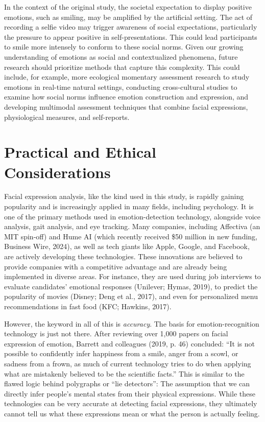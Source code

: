 \documentclass[authordate, reflection,issue]{jote-new-article}
\begin{document}
	In the context of the original study, the societal expectation to display positive emotions, such as smiling, may be amplified by the artificial setting. The act of recording a selfie video may trigger awareness of social expectations, particularly the pressure to appear positive in self-presentations. This could lead participants to smile more intensely to conform to these social norms. Given our growing understanding of emotions as social and contextualized phenomena, future research should prioritize methods that capture this complexity. This could include, for example, more ecological momentary assessment research to study emotions in real-time natural settings, conducting cross-cultural studies to examine how social norms influence emotion construction and expression, and developing multimodal assessment techniques that combine facial expressions, physiological measures, and self-reports.







	\section{Practical and Ethical Considerations}



	Facial expression analysis, like the kind used in this study, is rapidly gaining popularity and is increasingly applied in many fields, including psychology. It is one of the primary methods used in emotion-detection technology, alongside voice analysis, gait analysis, and eye tracking. Many companies, including Affectiva (an MIT spin-off) and Hume AI (which recently received \$50 million in new funding, Business Wire, 2024), as well as tech giants like Apple, Google, and Facebook, are actively developing these technologies. These innovations are believed to provide companies with a competitive advantage and are already being implemented in diverse areas. For instance, they are used during job interviews to evaluate candidates' emotional responses (Unilever; Hymas, 2019), to predict the popularity of movies (Disney; Deng et al., 2017), and even for personalized menu recommendations in fast food (KFC; Hawkins, 2017).



	However, the keyword in all of this is \emph{accuracy}. The basis for emotion-recognition technology is just not there. After reviewing over 1,000 papers on facial expression of emotion, Barrett and colleagues (2019, p. 46) concluded: “It is not possible to confidently infer happiness from a smile, anger from a scowl, or sadness from a frown, as much of current technology tries to do when applying what are mistakenly believed to be the scientific facts.” This is similar to the flawed logic behind polygraphs or “lie detectors”: The assumption that we can directly infer people's mental states from their physical expressions. While these technologies can be very accurate at detecting facial expressions, they ultimately cannot tell us what these expressions mean or what the person is actually feeling.
\end{document}
